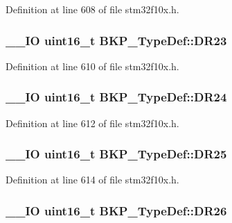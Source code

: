 Definition at line 608 of file stm32f10x.\-h.

\hypertarget{struct_b_k_p___type_def_a81ae6732bea9b86ebdad14e13e2fafcf}{
\subsubsection[{D\-R23}]{\setlength{\rightskip}{0pt plus 5cm}\-\_\-\-\_\-\-I\-O {\bf uint16\-\_\-t} B\-K\-P\-\_\-\-Type\-Def\-::\-D\-R23}}\label{struct_b_k_p___type_def_a81ae6732bea9b86ebdad14e13e2fafcf}


Definition at line 610 of file stm32f10x.\-h.

\hypertarget{struct_b_k_p___type_def_ad3797fc4d32046aef5680ddd0d890368}{
\subsubsection[{D\-R24}]{\setlength{\rightskip}{0pt plus 5cm}\-\_\-\-\_\-\-I\-O {\bf uint16\-\_\-t} B\-K\-P\-\_\-\-Type\-Def\-::\-D\-R24}}\label{struct_b_k_p___type_def_ad3797fc4d32046aef5680ddd0d890368}


Definition at line 612 of file stm32f10x.\-h.

\hypertarget{struct_b_k_p___type_def_a26779c5c85be6c3a5ea219c980be4ae2}{
\subsubsection[{D\-R25}]{\setlength{\rightskip}{0pt plus 5cm}\-\_\-\-\_\-\-I\-O {\bf uint16\-\_\-t} B\-K\-P\-\_\-\-Type\-Def\-::\-D\-R25}}\label{struct_b_k_p___type_def_a26779c5c85be6c3a5ea219c980be4ae2}


Definition at line 614 of file stm32f10x.\-h.

\hypertarget{struct_b_k_p___type_def_a04dc1fb867bdaa735d2036ac584f541b}{
\subsubsection[{D\-R26}]{\setlength{\rightskip}{0pt plus 5cm}\-\_\-\-\_\-\-I\-O {\bf uint16\-\_\-t} B\-K\-P\-\_\-\-Type\-Def\-::\-D\-R26}}\label{struct_b_k_p___type_def_a04dc1fb867bdaa735d2036ac584f541b}


